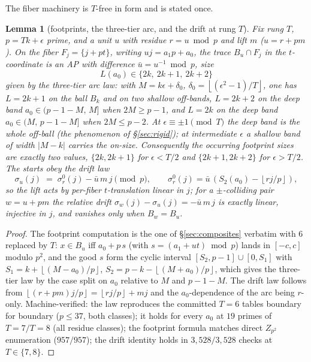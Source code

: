 \documentclass[11pt,a4paper]{article}
\numberwithin{equation}{section}
\theoremstyle{plain}
\theoremstyle{plain}
\newtheorem{lemma}[theorem]{Lemma}
\theoremstyle{definition}
\theoremstyle{remark}
\newcommand{\floor}[1]{\left\lfloor #1 \right\rfloor}
\begin{document}
The fiber machinery is $T$-free in form and is stated once.

\begin{lemma}[footprints, the three-tier arc, and the drift at rung $T$]
\label{lem:rungT}
Fix rung $T$, $p=Tk+\epsilon$ prime, and a unit $u$ with residue
$r=u\bmod p$ and lift $m$ ($u=r+pm$). On the fiber $F_j=\{j+pt\}$, writing
$uj=a_1p+a_0$, the trace $B_u\cap F_j$ in the $t$-coordinate is an AP
with difference $\bar u=u^{-1}\bmod p$, size
\[
L(a_0)\in\{2k,\ 2k+1,\ 2k+2\}
\]
given by the \emph{three-tier arc law}: with $M=k\epsilon+\delta_0$,
$\delta_0=\floor{(\epsilon^2-1)/T}$, one has $L=2k+1$ on the ball $B_k$
\emph{and} on two shallow off-bands, $L=2k+2$ on the deep band
$a_0\in(p-1-M,\,M]$ when $2M\ge p-1$, and $L=2k$ on the deep band
$a_0\in(M,\,p-1-M]$ when $2M\le p-2$. At $\epsilon\equiv\pm1\pmod T$ the
deep band is the whole off-ball (the phenomenon of \S\ref{sec:rigid});
at intermediate $\epsilon$ a shallow band of width $|M-k|$ carries the
on-size. Consequently the occurring footprint sizes are exactly two
values, $\{2k,2k+1\}$ for $\epsilon<T/2$ and $\{2k+1,2k+2\}$ for
$\epsilon>T/2$. The starts obey the \emph{drift law}
\[
\sigma_u(j)\;=\;\sigma_r^0(j)-\bar u\,m\,j\pmod p,
\qquad \sigma_r^0(j)=\bar u\,(S_2(a_0)-\floor{rj/p}),
\]
so the lift acts by per-fiber $t$-translation linear in $j$; for a
$\pm$-colliding pair $w=u+pm$ the relative drift
$\sigma_w(j)-\sigma_u(j)=-\bar u\,m\,j$ is exactly linear, injective in
$j$, and vanishes only when $B_w=B_u$.
\end{lemma}

\begin{proof}
The footprint computation is the one of \S\ref{sec:composites} verbatim
with $6$ replaced by $T$: $x\in B_u$ iff $a_0+p\,s$ (with
$s=(a_1+ut)\bmod p$) lands in $[-c,c]$ modulo $p^2$, and the good $s$
form the cyclic interval $[S_2,p-1]\cup[0,S_1]$ with
$S_1=k+\floor{(M-a_0)/p}$, $S_2=p-k-\floor{(M+a_0)/p}$, which gives the
three-tier law by the case split on $a_0$ relative to $M$ and $p-1-M$.
The drift law follows from $\floor{(r+pm)j/p}=\floor{rj/p}+mj$ and the
$a_0$-dependence of the arc being $r$-only. Machine-verified: the law
reproduces the committed $T=6$ tables boundary for boundary
($p\le37$, both classes); it holds for every $a_0$ at $19$ primes of
$T=7/T=8$ (all residue classes); the footprint formula matches direct
$Z_{p^2}$ enumeration ($957/957$); the drift identity holds in
$3{,}528/3{,}528$ checks at $T\in\{7,8\}$.
\end{proof}
\end{document}
